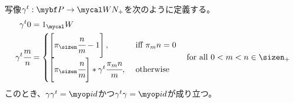 	\begin{proposition}[連分数表示のエンコード]
	\label{prop:連分数表示のエンコード} %
		写像$\gamma^t:\bunsub\to\Word N_+$を次のように定義する。
		\begin{equation*}\begin{split}
			\gamma^t 0 &= 1_\Word \\
			\gamma^t \cfrac{m}{n} &= \begin{cases}
				\left[\pi_\sizen\cfrac{n}{m} - 1\right], &\text{ iff } \pi_mn = 0 \\
				\left[\pi_\sizen\cfrac{n}{m}\right] * \gamma^t\cfrac{\pi_mn}{m}
				, &\text{ otherwise } \\
			\end{cases} \quad\text{for all }0<m<n\in\sizen_+
		\end{split}\end{equation*}
		このとき、$\gamma\gamma^t=\id$かつ$\gamma^t\gamma=\id$が成り立つ。
	\end{proposition} %
